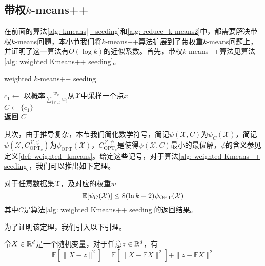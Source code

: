 \subsection{带权\texorpdfstring{$k$}{k}-means++}
在前面的算法\ref{alg: kmeans||_seeding}和\ref{alg: reduce_k-means2}中，都需要解决带权$k$-means问题，本小节我们将$k$-means++算法扩展到了带权重$k$-means问题上，并证明了这一算法有$O(\log k)$的近似系数。首先，带权$k$-means++算法见算法\ref{alg: weighted Kmeans++ seeding}。
\begin{algorithm}
    \caption{weighted $k$-means++ seeding}\label{alg: weighted Kmeans++ seeding}
    $c_1 \gets $ 以概率$\frac{w_x}{\sum_{i \in \mathcal{X}} w_i}$从$\mathcal{X}$中采样一个点$x$ \\
    $C \gets \{c_1\}$ \\
    \textbf{返回} $C$
\end{algorithm}
其次，由于推导复杂，本节我们简化数学符号，简记$\psi(\mathcal{X},C)$为$\psi_{C}(\mathcal{X})$，简记$\psi(\mathcal{X},C_{\text{OPT}_k}^{\mathcal{X},\psi})$为$\psi_{\text{OPT}}(\mathcal{X})$，$C_{\text{OPT}_k}^{\mathcal{X},\psi}$是使得$\psi(\mathcal{X},C)$最小的最优解，$\psi$的含义参见定义\ref{def: weighted_kmeans}。给定这些记号，对于算法\ref{alg: weighted Kmeans++ seeding}，我们可以推出如下定理。
\begin{theorem}
    \label{theo: weighted kmeans++}
    对于任意数据集$\mathcal{X}$，及对应的权重$w$
    \begin{equation}
        \mathbb{E}[\psi_C(\mathcal{X})] \leq 8(\ln k + 2) \psi_\text{OPT}(\mathcal{X})
    \end{equation}
    其中$C$是算法\ref{alg: weighted Kmeans++ seeding}的返回结果。
\end{theorem}
为了证明该定理，我们引入以下引理。
\begin{lemma}
    \label{lem: expectation}
    令$X\in \mathbb{R}^d$是一个随机变量，对于任意$z \in \mathbb{R}^d$，有
    \begin{equation}
        \label{eq: expectation1}
        \mathbb{E}[\|X-z\|^{2}]=\mathbb{E}[\|X-\mathbb{E} X\|^{2}]+\|z-\mathbb{E} X\|^{2}
    \end{equation}
\end{lemma}
